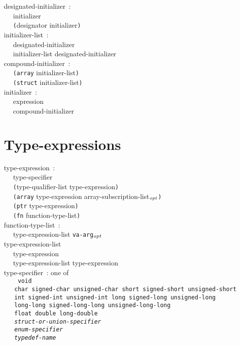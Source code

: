 \documentclass[a4]{article}
\def\|{\verb|} %|
\newcommand{\opt}{$_{{\it opt}}$}
\begin{document}
\noindent 
designated-initializer{\rm \ :} \\
\|  | initializer \\
\|  | {\tt (}designator initializer{\tt )}\\

\noindent
initializer-list{\rm \ :} \\
\|  | designated-initializer \\
\|  | initializer-list designated-initializer \\

\noindent
compound-initializer{\rm \ :} \\
\|  | {\tt (array} initializer-list{\tt )}\\
\|  | {\tt (struct} initializer-list{\tt )}\\

\noindent
initializer{\rm \ :} \\
\|  | expression \\
\|  | compound-initializer \\

\rm
\section{Type-expressions}
\it

\noindent
type-expression{\rm \ :} \\
\|  | type-specifier \\
\|  | {\tt (}type-qualifier-list type-expression{\tt )} \\
\|  | {\tt (array} type-expression array-subscription-list\opt{\tt )} \\
\|  | {\tt (ptr}  type-expression{\tt )} \\
\|  | {\tt (fn} function-type-list{\tt )} \\

\noindent
function-type-list{\rm \ :} \\
\|  | type-expression-list {\tt va-arg}\opt \\

\noindent
type-expression-list \\
\|  | type-expression \\
\|  | type-expression-list type-expression \\

\noindent
type-specifier{\rm \ :} {\rm one of} \\ \tt
\|  | void \\
\|  | char signed-char unsigned-char short signed-short unsigned-short \\
\|  | int signed-int unsigned-int long signed-long unsigned-long \\
\|  | long-long signed-long-long unsigned-long-long \\
\|  | float double long-double \\ \it
\|  | struct-or-union-specifier \\
\|  | enum-specifier \\
\|  | typedef-name \\
\end{document}
